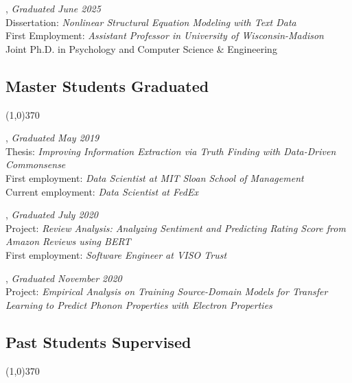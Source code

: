 \documentclass[10pt]{article}
\newenvironment{myindentpar}[1]%
{\begin{list}{}%
         {\setlength{\leftmargin}{#1}}%
         \item[]%
}
{\end{list}}
\newcounter{list}
\begin{document}
\begin{myindentpar}{0.75cm}
\hspace{-0.75cm}{\bf Lingbo Tong}, \textit{Graduated June 2025} \\
	{Dissertation: \textit{Nonlinear Structural Equation Modeling with Text Data}} \\
	{First Employment: \textit{Assistant Professor in University of Wisconsin-Madison}} \\	
	{Joint Ph.D. in Psychology and Computer Science \& Engineering}

\end{myindentpar}
	
\subsection{\sc Master Students Graduated}
\vspace{-0.4cm} \line(1,0){370} \vspace{-0.1cm}

\begin{myindentpar}{0.75cm}

\hspace{-0.75cm}{\bf Xueying Wang}, \textit{Graduated May 2019} \\
	{Thesis: \textit{Improving Information Extraction via Truth Finding with Data-Driven Commonsense}} \\
	{First employment: \textit{Data Scientist at MIT Sloan School of Management}} \\
	{Current employment: \textit{Data Scientist at FedEx}}

\hspace{-0.75cm}{\bf Bhakti Sharma}, \textit{Graduated July 2020} \\
	{Project: \textit{Review Analysis: Analyzing Sentiment and Predicting Rating Score from Amazon Reviews using BERT}} \\
	{First employment: \textit{Software Engineer at VISO Trust}}

\hspace{-0.75cm}{\bf Jianing Li}, \textit{Graduated November 2020} \\
	{Project: \textit{Empirical Analysis on Training Source-Domain Models for Transfer Learning to Predict Phonon Properties with Electron Properties}}

\end{myindentpar}

\subsection{\sc Past Students Supervised}
\vspace{-0.4cm} \line(1,0){370} \vspace{-0.1cm}
\end{document}
